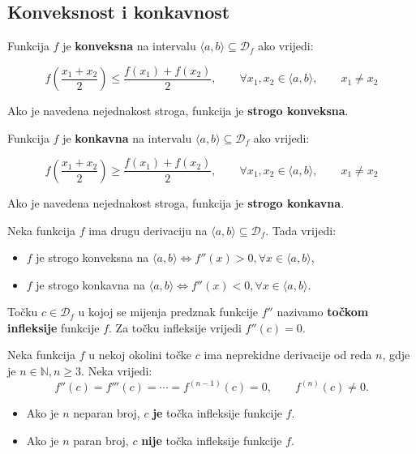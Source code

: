 \subsection{Konveksnost i konkavnost}

Funkcija $f$ je \textbf{konveksna} na intervalu $\langle a,b \rangle\subseteq\mathcal{D}_f$
ako vrijedi:

$$
f\left(\frac{x_1+x_2}{2}\right) \leq \frac{f(x_1)+f(x_2)}{2},\qquad\forall x_1,x_2 \in \langle a,b \rangle,\qquad x_1\neq x_2
$$

Ako je navedena nejednakost stroga, funkcija je \textbf{strogo konveksna}.


Funkcija $f$ je \textbf{konkavna} na intervalu $\langle a,b \rangle\subseteq\mathcal{D}_f$
ako vrijedi:

$$
f\left(\frac{x_1+x_2}{2}\right) \geq \frac{f(x_1)+f(x_2)}{2},\qquad\forall x_1,x_2 \in \langle a,b \rangle,\qquad x_1\neq x_2
$$

Ako je navedena nejednakost stroga, funkcija je \textbf{strogo konkavna}.

\begin{theorem}
    Neka funkcija $f$ ima drugu derivaciju na $\langle a,b \rangle\subseteq\mathcal{D}_f$.
    Tada vrijedi:
    \begin{itemize}
        \item $f$ je strogo konveksna na $\langle a,b \rangle \Leftrightarrow f''(x)>0,\forall x \in \langle a,b \rangle$,
        \item $f$ je strogo konkavna na $\langle a,b \rangle \Leftrightarrow f''(x)<0,\forall x \in \langle a,b \rangle$.
    \end{itemize}
\end{theorem}

Točku $c\in\mathcal{D}_f$ u kojoj se mijenja predznak funkcije $f''$ nazivamo
\textbf{točkom infleksije} funkcije $f$. Za točku infleksije vrijedi $f''(c) = 0$.

\begin{theorem}
    Neka funkcija $f$ u nekoj okolini točke $c$ ima neprekidne derivacije od
    reda $n$, gdje je $n\in\mathbb{N}, n\geq 3$.
    Neka vrijedi:
    $$
    f''(c)=f'''(c)=\cdots=f^{(n-1)}(c)=0,\qquad f^{(n)}(c) \neq 0.
    $$

    \begin{itemize}
        \item Ako je $n$ neparan broj, $c$ \textbf{je} točka infleksije funkcije $f$.
        \item Ako je $n$ paran broj, $c$ \textbf{nije} točka infleksije funkcije $f$.
    \end{itemize}
\end{theorem}

